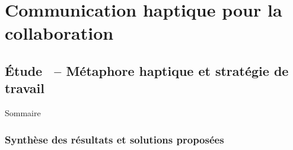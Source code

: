 \documentclass[english,french,dvips,10pt]{mybeamer}
\begin{document}
	\section{Communication haptique pour la collaboration}
	\subsection{Étude~ -- Métaphore haptique et stratégie de travail}
	\begin{myframe}{Sommaire}
		\tableofcontents[sectionstyle=show/shaded,subsectionstyle=show/shaded/hide,subsubsectionstyle=show/show/hide]
	\end{myframe}
	\subsubsection{Synthèse des résultats et solutions proposées}
\end{document}
